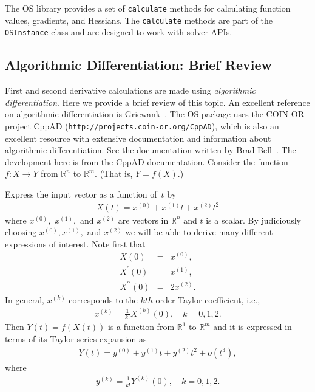 \documentclass[11pt]{article}
\renewcommand{\_}{{\char"5F}}
\renewcommand{\{}{{\char"7B}}
\renewcommand{\}}{{\char"7D}}
\renewcommand{\^}{{\char"0D}}
\renewcommand{\'}{{\char"0D}}
\newcommand{\UrlCppad}{http://projects.coin-or.org/CppAD}
\begin{document}
\begin{enumerate}[Step 1:]
The OS library provides a set of {\tt calculate} methods for calculating  function values, gradients, and Hessians.
The {\tt calculate} methods are part of the {\tt OSInstance} class and are designed to work with solver APIs.



\subsection{Algorithmic Differentiation:  Brief Review}\label{section:adtheory}

First and second derivative calculations are made using 
{\it algorithmic differentiation}.
Here we provide a brief review of this topic.  An excellent reference on algorithmic differentiation
is Griewank~\cite{griewank2000}.  The OS package uses the COIN-OR project 
CppAD ({\tt\UrlCppad}), which  is also an excellent resource with extensive  
documentation and information about algorithmic differentiation.
See the documentation written by  Brad Bell~\cite{bell2007}.    
The development here is from the CppAD documentation.  
Consider the function $f:X \rightarrow Y$ from $ \mathbb{R}^{n}$ to $ \mathbb{R}^{m}$.
(That is, $Y = f(X).$)

Express the input vector as a function of~$t$ by
\begin{eqnarray}
X(t) = x^{(0)} +  x^{(1)} t +  x^{(2)} t^{2}
\end{eqnarray}
where $ x^{(0)},$ $x^{(1)},$ and $x^{(2)}$ are vectors in $ \mathbb{R}^{n}$  and $t$ is a scalar.  By judiciously choosing $x^{(0)}, x^{(1)},$ and $x^{(2)}$ we will be able to derive many different expressions of interest.  Note first that
\begin{eqnarray*}
X(0) &=& x^{(0)}, \\
X^{\prime}(0) &=& x^{(1)}, \\
X^{\prime \prime }(0) &=& 2 x^{(2)}.
\end{eqnarray*}
In general,  $x^{(k)}$ corresponds to the $kth$ order Taylor coefficient, i.e.,
\begin{eqnarray}
x^{(k)} = \frac{1}{k!}X^{(k)}(0), \quad k = 0, 1, 2.  \label{eq:xTaylorCoeff}
\end{eqnarray}
Then $Y(t) = f(X(t))$ is a function from $ \mathbb{R}^{1}$ to $ \mathbb{R}^{m}$ and it is expressed in terms of its Taylor series expansion as
\begin{eqnarray}
Y(t)  = y^{(0)} +  y^{(1)} t +  y^{(2)} t^{2} + o(t^{3}),
\end{eqnarray}
where
\begin{eqnarray}
y^{(k)} = \frac{1}{k!} Y^{(k)}(0), \quad k = 0, 1, 2.  \label{eq:yTaylorCoeff}
\end{eqnarray}




\end{enumerate}
\end{document}
